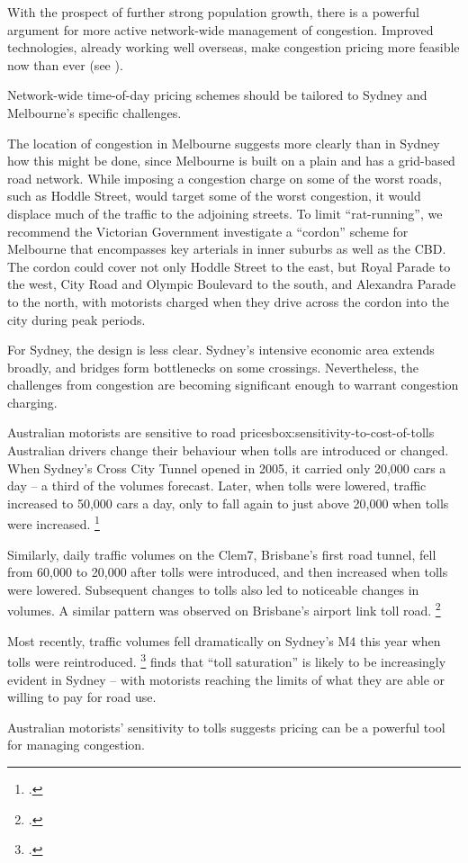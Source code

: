 \documentclass{grattan}
\begin{document}
With the prospect of further strong population growth, there is a powerful argument for more active network-wide management of congestion.
Improved technologies, already working well overseas, make congestion pricing more feasible now than ever (see ).

Network-wide time-of-day pricing schemes should be tailored to Sydney and Melbourne's specific challenges.

The location of congestion in Melbourne suggests more clearly than in Sydney how this might be done, since Melbourne is built on a plain and has a grid-based road network. While imposing a congestion charge on some of the worst roads, such as Hoddle Street, would target some of the worst congestion, it would displace much of the traffic to the adjoining streets. To limit ``rat-running'', we recommend the Victorian Government investigate a ``cordon'' scheme for Melbourne that encompasses key arterials in inner suburbs as well as the CBD\@.
The cordon could cover not only Hoddle Street to the east, but Royal Parade to the west, City Road and Olympic Boulevard to the south, and Alexandra Parade to the north, with motorists charged when they drive across the cordon into the city during peak periods.

For Sydney, the design is less clear. Sydney's intensive economic area extends broadly, and bridges form bottlenecks on some crossings. Nevertheless, the challenges from congestion are becoming significant enough to warrant congestion charging.


\begin{smallbox}{Australian motorists are sensitive to road prices}{box:sensitivity-to-cost-of-tolls}
Australian drivers change their behaviour when tolls are introduced or changed.
When Sydney's Cross City Tunnel opened in 2005, it carried only 20,000 cars a day -- a third of the volumes forecast.
Later, when tolls were lowered, traffic increased to 50,000 cars a day, only to fall again to just above 20,000 when tolls were increased.%
\footcite{Auditor-General-CCT}

Similarly, daily traffic volumes on the Clem7, Brisbane's first road tunnel, fell from 60,000 to 20,000 after tolls were introduced, and then increased when tolls were lowered.
Subsequent changes to tolls also led to noticeable changes in volumes.
A similar pattern was observed on Brisbane's airport link toll road.%
    \footcite{Loader-charting-transport-Traffic-volumes-on-Australian-toll-roads}

Most recently, traffic volumes fell dramatically on Sydney's M4 this year when tolls were reintroduced.%
    \footcite{OSullivan-2017-SMH-New-M4-toll-funnels-more-onto-Parramatta-Rd}
\textcite{Henscher-how-much-is-too-much-for-tolled-road-users} finds that ``toll saturation'' is likely to be increasingly evident in Sydney -- with motorists reaching the limits of what they are able or willing to pay for road use.

Australian motorists' sensitivity to tolls suggests pricing can be a powerful tool for managing congestion. 

\end{smallbox}
\end{document}
